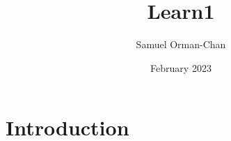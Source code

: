 \documentclass{article}
\title{Learn1}
\author{Samuel Orman-Chan}
\date{February 2023}
\begin{document}
\maketitle
\section{Introduction}
\end{document}
